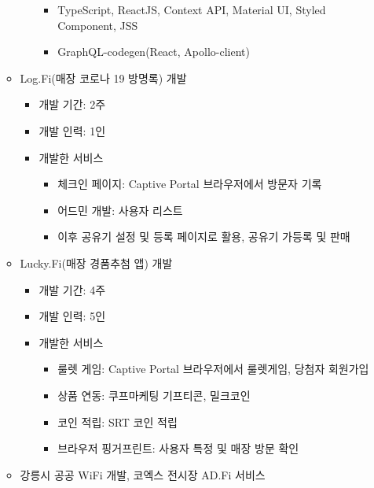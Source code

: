 \begin{itemize}[label=]
\begin{itemize}[label=]
\begin{itemize}[label=]
			                  \begin{itemize}
				                  \item TypeScript, ReactJS, Context API, Material UI, Styled Component, JSS
				                  \item GraphQL-codegen(React, Apollo-client)
			                  \end{itemize}
		            \end{itemize}
		      \item Log.Fi(매장 코로나 19 방명록) 개발
		            \begin{itemize}[label=]
			            \item 개발 기간: 2주
			            \item 개발 인력: 1인
			            \item 개발한 서비스
			                  \begin{itemize}
				                  \item 체크인 페이지: Captive Portal 브라우저에서 방문자 기록
				                  \item 어드민 개발: 사용자 리스트
				                  \item 이후 공유기 설정 및 등록 페이지로 활용, 공유기 가등록 및 판매
			                  \end{itemize}
		            \end{itemize}
		      \item Lucky.Fi(매장 경품추첨 앱) 개발
		            \begin{itemize}[label=]
			            \item 개발 기간: 4주
			            \item 개발 인력: 5인
			            \item 개발한 서비스
			                  \begin{itemize}
				                  \item 룰렛 게임: Captive Portal 브라우저에서 룰렛게임, 당첨자 회원가입
				                  \item 상품 연동: 쿠프마케팅 기프티콘, 밀크코인
				                  \item 코인 적립: SRT 코인 적립
				                  \item 브라우저 핑거프린트: 사용자 특정 및 매장 방문 확인
			                  \end{itemize}
		            \end{itemize}
		      \item 강릉시 공공 WiFi 개발, 코엑스 전시장 AD.Fi 서비스

\end{itemize}
\end{itemize}
